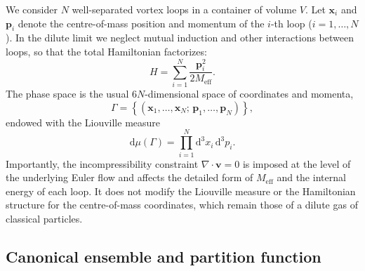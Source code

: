 \documentclass[11pt]{article}
\begin{document}
            We consider $N$ well-separated vortex loops in a container of volume $V$.
            Let $\boldsymbol{x}_i$ and $\boldsymbol{p}_i$ denote the centre-of-mass position and
            momentum of the $i$-th loop ($i=1,\dots,N$). In the dilute limit we neglect mutual
            induction and other interactions between loops, so that the total Hamiltonian factorizes:
            \begin{equation}
                H = \sum_{i=1}^{N} \frac{\boldsymbol{p}_i^2}{2M_{\mathrm{eff}}}.
                \label{eq:H-nonrel}
            \end{equation}
            The phase space is the usual $6N$-dimensional space of coordinates and momenta,
            \begin{equation}
                \Gamma = \left\{ (\boldsymbol{x}_1,\dots,\boldsymbol{x}_N;\,
                             \boldsymbol{p}_1,\dots,\boldsymbol{p}_N) \right\},
            \end{equation}
            endowed with the Liouville measure
            \begin{equation}
                \mathrm{d}\mu(\Gamma)
                = \prod_{i=1}^{N} \mathrm{d}^3x_i\,\mathrm{d}^3p_i.
            \end{equation}
            Importantly, the incompressibility constraint $\nabla\cdot\boldsymbol{v}=0$ is imposed
            at the level of the underlying Euler flow and affects the detailed form of
            $M_{\mathrm{eff}}$ and the internal energy of each loop. It does not modify the
            Liouville measure or the Hamiltonian structure for the centre-of-mass coordinates,
            which remain those of a dilute gas of classical particles.

        \subsection{Canonical ensemble and partition function}
\end{document}
